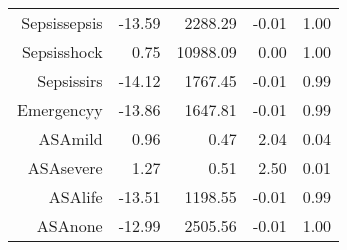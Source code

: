 \begin{tabular}{rrrrr}
$$  Sepsis\-sepsis & -13.59 & 2288.29 & -0.01 & 1.00 \\ 
  Sepsis\-shock & 0.75 & 10988.09 & 0.00 & 1.00 \\ 
  Sepsis\-sirs & -14.12 & 1767.45 & -0.01 & 0.99 \\ 
  Emergency\-y & -13.86 & 1647.81 & -0.01 & 0.99 \\ 
  ASA\-mild & 0.96 & 0.47 & 2.04 & 0.04 \\ 
  ASA\-severe & 1.27 & 0.51 & 2.50 & 0.01 \\ 
  ASA\-life & -13.51 & 1198.55 & -0.01 & 0.99 \\ 
  ASA\-none & -12.99 & 2505.56 & -0.01 & 1.00 \\ 
   \hline
\end{tabular}

